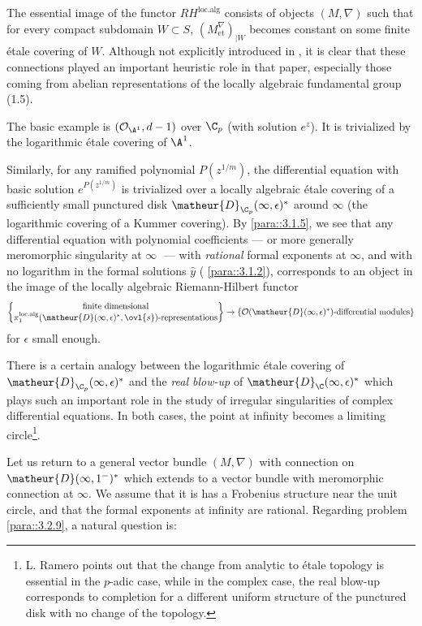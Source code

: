 \begin{para}\label{para::3.5.4} The essential image of the functor
 $RH^{\mathrm{loc.alg}}$ consists of objects $(M,\nabla)$ such that for every
 compact subdomain $W\subset S$, $(M_{\mathrm{et}}^\nabla)_{| W}$ becomes
 constant on some finite \'etale covering of $W$.
 Although not explicitly introduced in \cite{ramero98}, it is clear that
 these connections played an important heuristic role in that paper,
 especially those coming from abelian representations of the locally
 algebraic fundamental group (1.5).

 The basic example is $(\mathcal{O}_{\A^1}, d-1)$ over $\C_p$ (with
 solution $e^z$). It is trivialized by the logarithmic \'etale covering
 of ${\A^1}$.
 
 Similarly, for any ramified polynomial $P(z^{1/m})$, the differential
 equation with basic solution $e^{P(z^{1/m})}$ is trivialized over a
 locally algebraic \'etale covering of a sufficiently small punctured
 disk $\matheur{D}_{\C_p}(\infty,\epsilon)^\ast$ around $\infty$ (the
 logarithmic 
 covering of a Kummer covering). By \ref{para::3.1.5}, we see that any
 differential 
 equation with polynomial coefficients --- or more generally meromorphic
 singularity at $\infty\;$ --- with {\it rational} formal exponents at
 $\infty$, and with no logarithm in the formal solutions $\hat y$ (\cf
 \ref{para::3.1.2}), corresponds to an object in the image of the
 locally algebraic Riemann-Hilbert functor
 \begin{equation*}
  \left\{
   \begin{matrix}
    \text{finite dimensional}\\
    \text{$\pi_1^{\mathrm{loc.alg}}(\matheur{D}(\infty,\epsilon)^\ast,
    \ovl{s})$-representations}
   \end{matrix}
  \right\}
  \to
  \{\text{$\mathcal{O}(\matheur{D}(\infty,\epsilon)^\ast)$-differential
  modules}\}
 \end{equation*}
 for $\epsilon$ small enough.

 There is a certain analogy between the logarithmic \'etale
 covering of $\matheur{D}_{\C_p}(\infty,\epsilon)^\ast$ and the {\it
 real blow-up} of $\matheur{D}_{\C}(\infty,\epsilon)^\ast$ which plays
 such an important role in 
 the study of irregular singularities of complex differential
 equations. In both cases, the point at infinity becomes a limiting
 circle\footnote{L. Ramero points out that the change from analytic to
 \'etale topology is essential in the $p$-adic case, while in the
 complex case, the real blow-up corresponds to completion for a
 different uniform structure of the punctured disk with no change of the
 topology.}.

\medskip Let us return to a general vector bundle $(M,\nabla)$ with
 connection on $\matheur{D}(\infty,1^-)^\ast$ which extends to a vector bundle
 with meromorphic connection at $\infty$. We assume that it is has a
 Frobenius structure near the unit circle, and that the formal exponents
 at infinity are rational. Regarding problem \ref{para::3.2.9}, a
 natural question is:
\end{para}

